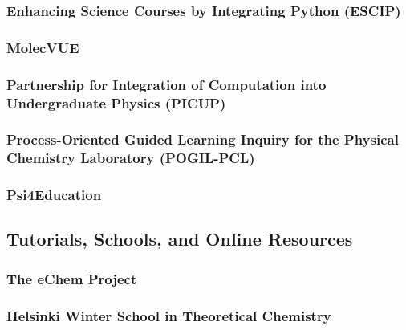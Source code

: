 \documentclass[9pt,review]{livecoms}
\begin{document}
\subsubsection{Enhancing Science Courses by Integrating Python (ESCIP)}


\subsubsection{MolecVUE}


\subsubsection{Partnership for Integration of Computation into Undergraduate Physics (PICUP)}


\subsubsection{Process-Oriented Guided Learning Inquiry for the Physical Chemistry Laboratory (POGIL-PCL)}


\subsubsection{Psi4Education}


\subsection{Tutorials, Schools, and Online Resources}

\subsubsection{The eChem Project}



\subsubsection{Helsinki Winter School in Theoretical Chemistry}


\end{document}
